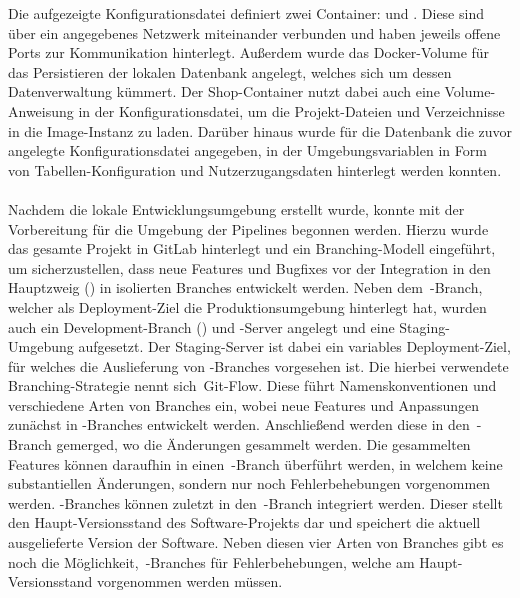 Die aufgezeigte Konfigurationsdatei definiert zwei Container:  und .
Diese sind über ein angegebenes Netzwerk  miteinander verbunden und haben jeweils offene Ports zur
Kommunikation hinterlegt.
Außerdem wurde das Docker-Volume  für das Persistieren der lokalen Datenbank angelegt,
welches sich um dessen Datenverwaltung kümmert.
Der Shop-Container nutzt dabei auch eine Volume-Anweisung in der Konfigurationsdatei, um die Projekt-Dateien und
Verzeichnisse in die Image-Instanz zu laden.
Darüber hinaus wurde für die Datenbank die zuvor angelegte Konfigurationsdatei  angegeben, in der
Umgebungsvariablen in Form von Tabellen-Konfiguration und Nutzerzugangsdaten hinterlegt werden konnten.
\\\\
Nachdem die lokale Entwicklungsumgebung erstellt wurde, konnte mit der Vorbereitung für die Umgebung der Pipelines
begonnen werden.
Hierzu wurde das gesamte Projekt in GitLab hinterlegt und ein Branching-Modell eingeführt, um sicherzustellen, dass
neue Features und Bugfixes vor der Integration in den Hauptzweig () in isolierten Branches entwickelt
werden.
Neben dem\ -Branch, welcher als Deployment-Ziel die Produktionsumgebung hinterlegt hat, wurden auch
ein Development-Branch () und -Server angelegt und eine Staging-Umgebung aufgesetzt.
Der Staging-Server ist dabei ein variables Deployment-Ziel, für welches die Auslieferung von
-Branches vorgesehen ist.
Die hierbei verwendete Branching-Strategie nennt sich\ \glqq Git-Flow\grqq.
Diese führt Namenskonventionen und verschiedene Arten von Branches ein, wobei neue Features und Anpassungen zunächst in
-Branches entwickelt werden.
Anschließend werden diese in den\ -Branch gemerged, wo die Änderungen gesammelt werden.
Die gesammelten Features können daraufhin in einen\ -Branch überführt werden, in welchem keine
substantiellen Änderungen, sondern nur noch Fehlerbehebungen vorgenommen werden.
-Branches können zuletzt in den\ -Branch integriert werden.
Dieser stellt den Haupt-Versionsstand des Software-Projekts dar und speichert die aktuell ausgelieferte Version der
Software.
Neben diesen vier Arten von Branches gibt es noch die Möglichkeit,\ -Branches für Fehlerbehebungen,
welche am Haupt-Versionsstand vorgenommen werden müssen.

